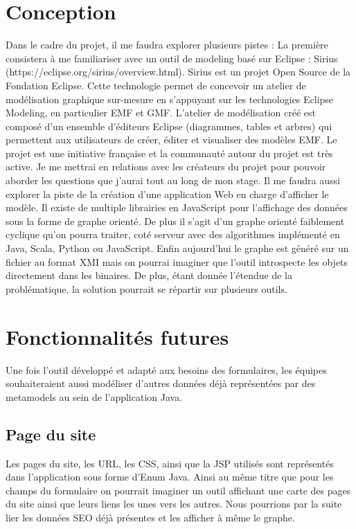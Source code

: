 \section{Conception}
Dans le cadre du projet, il me faudra explorer plusieurs pistes :
La première consistera à me familiariser avec un outil de modeling basé sur Eclipse : Sirius (https://eclipse.org/sirius/overview.html). Sirius est un projet Open Source de la Fondation Eclipse. Cette technologie permet de concevoir un atelier de modélisation graphique sur-mesure en s'appuyant sur les technologies Eclipse Modeling, en particulier EMF et GMF. L'atelier de modélisation créé est composé d'un ensemble d'éditeurs Eclipse (diagrammes, tables et arbres) qui permettent aux utilisateurs de créer, éditer et visualiser des modèles EMF. Le projet est une initiative française et la communauté autour du projet est très active. Je me mettrai en relations avec les créateurs du projet pour pouvoir aborder les questions que j’aurai tout au long de mon stage.
Il me faudra aussi explorer la piste de la création d'une application Web en charge d’afficher le modèle. Il existe de multiple librairies en JavaScript pour l’affichage des données sous la forme de graphe orienté. De plus il s'agit d'un graphe orienté faiblement cyclique qu'on pourra traiter, coté serveur avec des algorithmes implémenté en Java, Scala, Python ou JavaScript. Enfin aujourd’hui le graphe est généré sur un fichier au format XMI mais on pourrai imaginer que l’outil introspecte les objets directement dans les binaires. De plus, étant donnée l'étendue de la problématique, la solution pourrait se répartir sur plusieurs outils.

\section{Fonctionnalités futures}
Une fois l’outil développé et adapté aux besoins des formulaires, les équipes souhaiteraient aussi modéliser d'autres données déjà représentées par des metamodels au sein de l'application Java.

\subsection{Page du site}
Les pages du site, les URL, les CSS, ainsi que la JSP utilisés sont représentés dans l'application sous forme d'Enum Java. Ainsi au même titre que pour les champs du formulaire on pourrait imaginer un outil affichant une carte des pages du site ainsi que leurs liens les unes vers les autres. Nous pourrions par la suite lier les données SEO déjà présentes et les afficher à même le graphe.


